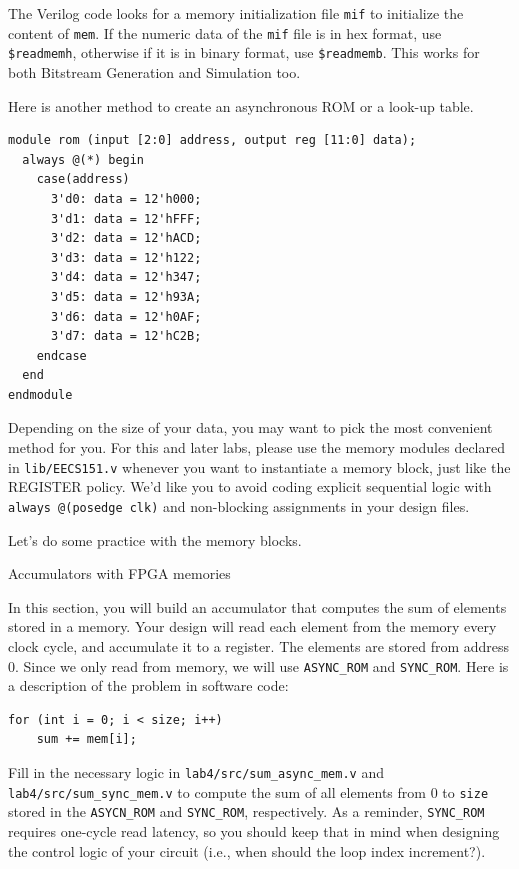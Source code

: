 \documentclass[11pt]{article}
\makeatletter
\renewcommand{\subsection}
{\@startsection {subsection}{1}{0pt}
 {-1ex}
 {0.5ex}
 {\bfseries\normalsize}}
\makeatother
\begin{document}
The Verilog code looks for a memory initialization file \verb|mif| to initialize the content of \verb|mem|. If the numeric data of the \verb|mif| file is in hex format, use \verb|$readmemh|, otherwise if it is in binary format, use \verb|$readmemb|. This works for both Bitstream Generation and Simulation too.

Here is another method to create an asynchronous ROM or a look-up table.

\begin{verbatim}
module rom (input [2:0] address, output reg [11:0] data);
  always @(*) begin
    case(address)
      3'd0: data = 12'h000;
      3'd1: data = 12'hFFF;
      3'd2: data = 12'hACD;
      3'd3: data = 12'h122;
      3'd4: data = 12'h347;
      3'd5: data = 12'h93A;
      3'd6: data = 12'h0AF;
      3'd7: data = 12'hC2B;
    endcase
  end
endmodule
\end{verbatim}

Depending on the size of your data, you may want to pick the most convenient method for you. For this and later labs, please use the memory modules declared in \verb|lib/EECS151.v| whenever you want to instantiate a memory block, just like the REGISTER policy. We'd like you to avoid coding explicit sequential logic with \verb|always @(posedge clk)| and non-blocking assignments in your design files.

Let's do some practice with the memory blocks.

\subsection{Accumulators with FPGA memories}

In this section, you will build an accumulator that computes the sum of elements stored in a memory. Your design will read each element from the memory every clock cycle, and accumulate it to a register. The elements are stored from address 0. Since we only read from memory, we will use \verb|ASYNC_ROM| and \verb|SYNC_ROM|. Here is a description of the problem in software code:

\begin{verbatim}
for (int i = 0; i < size; i++)
    sum += mem[i];
\end{verbatim}


Fill in the necessary logic in \verb|lab4/src/sum_async_mem.v| and \verb|lab4/src/sum_sync_mem.v| to compute the sum of all elements from 0 to \verb|size| stored in the \verb|ASYCN_ROM| and \verb|SYNC_ROM|, respectively. As a reminder, \verb|SYNC_ROM| requires one-cycle read latency, so you should keep that in mind when designing the control logic of your circuit (i.e., when should the loop index increment?).
\end{document}
